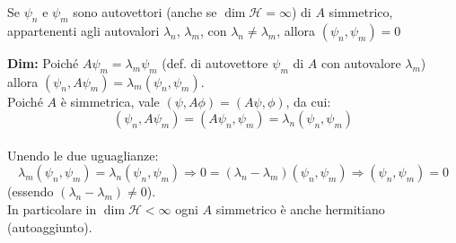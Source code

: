 \begin{thm}
Se $\psi_n$ e $\psi_m$ sono autovettori (anche se $\dim{\mathcal{H}=\infty}$) di $A$ simmetrico, appartenenti agli autovalori $\lambda_n$, $\lambda_m$, con $\lambda_n\neq \lambda_m$, allora $\left(\psi_n, \psi_m\right)=0$
\end{thm}
\textbf{Dim:} Poiché $A\psi_m = \lambda_m \psi_m$ (def. di autovettore $\psi_m$ di $A$ con autovalore $\lambda_m$) allora $\left(\psi_n, A\psi_m\right)=\lambda_m\left(\psi_n, \psi_m\right)$.\\
Poiché $A$ è simmetrica, vale $(\psi, A \phi) = (A \psi, \phi)$, da cui:
\[ (\psi_n, A\psi_m) = (A\psi_n, \psi_m) = \lambda_n (\psi_n, \psi_m)\]\\
Unendo le due uguaglianze:
\[
\lambda_m (\psi_n, \psi_m) = \lambda_n (\psi_n, \psi_m) \Rightarrow 0 = (\lambda_n -\lambda_m)(\psi_n, \psi_m) \Rightarrow (\psi_n, \psi_m) = 0
\]
(essendo $\left(\lambda_n-\lambda_m\right)\neq 0$).\\
In particolare in $\dim{\mathcal{H}<\infty}$ ogni $A$ simmetrico è anche hermitiano (autoaggiunto).\\ %

